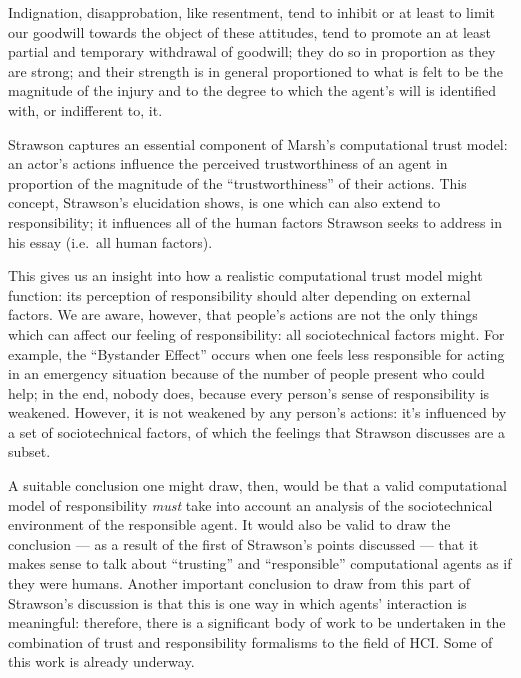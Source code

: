 \begin{displayquote}
    Indignation, disapprobation, like resentment, tend to inhibit or at least to limit our goodwill towards the object of these attitudes, tend to promote an at least partial and temporary withdrawal of goodwill; they do so in proportion as they are strong; and their strength is in general proportioned to what is felt to be the magnitude of the injury and to the degree to which the agent’s will is identified with, or indifferent to, it.
\end{displayquote}\cite{strawson}\par

Strawson captures an essential component of Marsh's computational trust model: an actor's actions influence the perceived trustworthiness of an agent in proportion of the magnitude of the ``trustworthiness'' of their actions. This concept, Strawson's elucidation shows, is one which can also extend to responsibility; it influences all of the human factors Strawson seeks to address in his essay (i.e.\ all human factors).\par

This gives us an insight into how a realistic computational trust model might function: its perception of responsibility should alter depending on external factors. We are aware, however, that people's actions are not the only things which can affect our feeling of responsibility: all sociotechnical factors might. For example, the ``Bystander Effect''\cite{unresponsive_bystander} occurs when one feels less responsible for acting in an emergency situation because of the number of people present who could help; in the end, nobody does, because every person's sense of responsibility is weakened. However, it is not weakened by any person's actions: it's influenced by a set of sociotechnical factors, of which the feelings that Strawson discusses are a subset.\par

A suitable conclusion one might draw, then, would be that a valid computational model of responsibility \emph{must} take into account an analysis of the sociotechnical environment of the responsible agent. It would also be valid to draw the conclusion --- as a result of the first of Strawson's points discussed --- that it makes sense to talk about ``trusting'' and ``responsible'' computational agents as if they were humans. Another important conclusion to draw from this part of Strawson's discussion is that this is one way in which agents' interaction is meaningful: therefore, there is a significant body of work to be undertaken in the combination of trust and responsibility formalisms to the field of HCI\@. Some of this work is already underway\cite{Marsh2011, Macy2002}. \par

